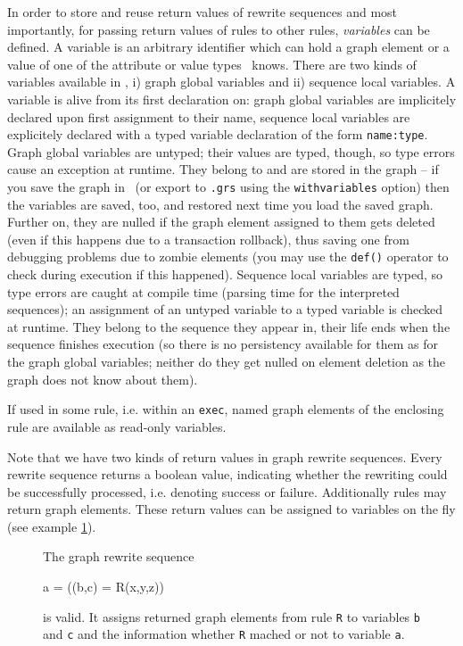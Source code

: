 In order to store and reuse return values of rewrite sequences and most importantly, 
for passing return values of rules to other rules, \emph{variables} can be defined.
A variable is an arbitrary identifier which can hold a graph element or a value of one of the attribute or value types \GrG\ knows.
There are two kinds of variables available in \GrG,
i) graph global variables and 
ii) sequence local variables.
A variable is alive from its first declaration on: graph global variables are implicitely declared upon first assignment to their name,
sequence local variables are explicitely declared with a typed variable declaration of the form \texttt{name:type}.
Graph global variables are untyped; their values are typed, though, so type errors cause an exception at runtime.
They belong to and are stored in the graph -- if you save the graph in \GrShell\ (or export to \texttt{.grs} using the \texttt{withvariables} option)
then the variables are saved, too, and restored next time you load the saved graph.
Further on, they are nulled if the graph element assigned to them gets deleted (even if this happens due to a transaction rollback),
thus saving one from debugging problems due to zombie elements (you may use the \texttt{def()} operator to check during execution if this happened).
Sequence local variables are typed, so type errors are caught at compile time (parsing time for the interpreted sequences); 
an assignment of an untyped variable to a typed variable is checked at runtime.
They belong to the sequence they appear in, their life ends when the sequence finishes execution 
(so there is no persistency available for them as for the graph global variables; neither do they get nulled on element deletion as the graph does not know about them). 

If used in some rule, i.e. within an \texttt{exec}, named graph elements of the enclosing rule are available as read-only variables.

Note that we have two kinds of return values in graph rewrite sequences.
Every rewrite sequence returns a boolean value, indicating whether the rewriting could be successfully processed, i.e. denoting success or failure.
Additionally rules may return graph elements.
These return values can be assigned to variables on the fly (see example \ref{ex:grsreturn}).
\begin{figure}[htbp]
\begin{example}
	\label{ex:grsreturn}
	The graph rewrite sequence
	\begin{grgen}	 
a = ((b,c) = R(x,y,z))
	\end{grgen}
	is valid. 
	It assigns returned graph elements from rule \texttt{R} to variables \texttt{b} and \texttt{c} and the information whether \texttt{R} mached or not to variable \texttt{a}.
\end{example}
\end{figure}


